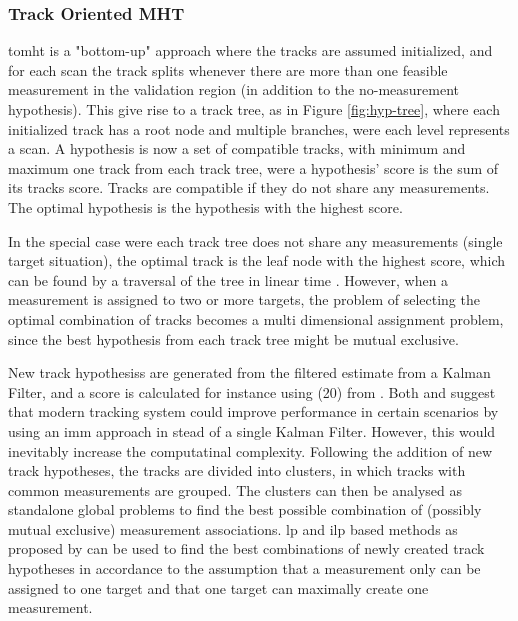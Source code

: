 \subsubsection{Track Oriented MHT}
\label{subsec:tomht}
\gls{tomht} is a "bottom-up" approach where the tracks are assumed initialized, and for each scan the track splits whenever there are more than one feasible \gls{measurement} in the validation region (in addition to the \gls{no-measurement hypothesis}). This give rise to a track tree, as in Figure \ref{fig:hyp-tree}, where each initialized track has a root node and multiple branches, were each level represents a scan. A hypothesis is now a set of compatible tracks, with minimum and maximum one track from each track tree, were a hypothesis' \gls{score} is the sum of its \glspl{track} \gls{score}. Tracks are compatible if they do not share any \glspl{measurement}. The optimal hypothesis is the hypothesis with the highest \gls{score}.

In the special case were each track tree does not share any \glspl{measurement} (single \gls{target} situation), the optimal track is the leaf node with the highest \gls{score}, which can be found by a traversal of the tree in linear time \cite{Tarjan1971}. However, when a \gls{measurement} is assigned to two or more \glspl{target}, the problem of selecting the optimal combination of tracks becomes a multi dimensional assignment problem, since the best hypothesis from each track tree might be mutual exclusive.

New \glspl{track hypothesis} are generated from the filtered estimate from a Kalman Filter, and a \gls{score} is calculated for instance using (20) from \cite{Bar-Shalom2007}. Both \cite{Bar-Shalom2007} and  \cite{Blackman2004} suggest that modern tracking system could improve performance in certain scenarios by using an \gls{imm} approach in stead of a single Kalman Filter. However, this would inevitably increase the computatinal complexity. Following the addition of new track hypotheses, the tracks are divided into clusters, in which tracks with common \glspl{measurement} are grouped. The clusters can then be analysed as standalone global problems to find the best possible combination of (possibly mutual exclusive) \gls{measurement} associations. \gls{lp} and \gls{ilp} based methods as proposed by \cite{Storms2003} can be used to find the best combinations of newly created track hypotheses in accordance to the assumption that a \gls{measurement} only can be assigned to one \gls{target} and that one \gls{target} can maximally create one \gls{measurement}.

